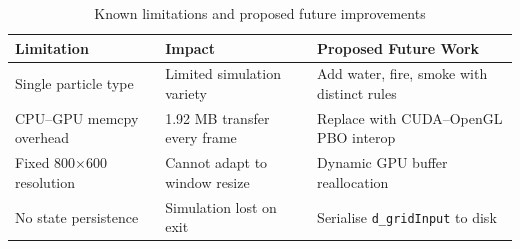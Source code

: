 \documentclass[12pt,a4paper]{article}
\begin{document}
    \begin{table}[h]
    \centering
    \begin{tabular}{|p{4cm}|p{4.5cm}|p{5cm}|}
    \hline
    \textbf{Limitation} & \textbf{Impact} & \textbf{Proposed Future Work} \\
    \hline
    Single particle type & Limited simulation variety & Add water, fire, smoke with distinct rules \\
    \hline
    CPU--GPU memcpy overhead & 1.92 MB transfer every frame & Replace with CUDA--OpenGL PBO interop \\
    \hline
    Fixed 800$\times$600 resolution & Cannot adapt to window resize & Dynamic GPU buffer reallocation \\
    \hline
    No state persistence & Simulation lost on exit & Serialise \texttt{d\_gridInput} to disk \\
    \hline
    \end{tabular}
    \caption{Known limitations and proposed future improvements}
    \label{Table:limitations}
    \end{table}


	\newpage
	
	
\end{document}

